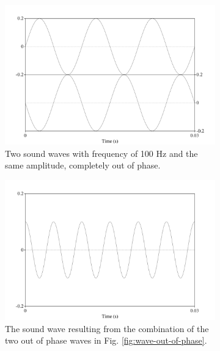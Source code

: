 \begin{figure}[H]
\begin{subfigure}{0.5\textwidth}
  \includegraphics[width=\textwidth]{figure/wave-out-of-phase.png}
  \caption{Two sound waves with frequency of 100 Hz and the same amplitude, completely out of phase.}
  \label{fig:wave-out-of-phase2}
\end{subfigure}
\qquad
\begin{subfigure}{0.5\textwidth}
  \includegraphics[width=\textwidth]{figure/sound-wave-addition-200hz-shifted.png}
  \caption{The sound wave resulting from the combination of the two out of phase waves in Fig. \ref{fig:wave-out-of-phase}.}
  \label{fig:wave-addition-200hz-shifted}
\end{subfigure}
%
\begin{center}
\begin{subfigure}{0.5\textwidth}

\end{subfigure}
\end{center}
\end{figure}
